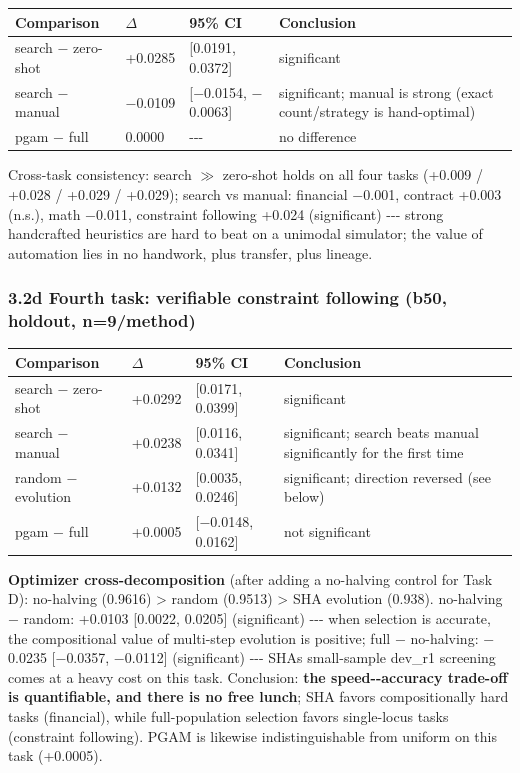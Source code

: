 \begin{longtable}[]{@{}llll@{}}
\toprule\noalign{}
Comparison & \(\Delta\) & 95\% CI & Conclusion \\
\midrule\noalign{}
\endhead
\bottomrule\noalign{}
\endlastfoot
search \(-\) zero-shot & +0.0285 & {[}0.0191, 0.0372{]} & significant \\
search \(-\) manual & \(-\)0.0109 & {[}\(-\)0.0154, \(-\)0.0063{]} & significant; manual is strong (exact count/strategy is hand-optimal) \\
pgam \(-\) full & 0.0000 & -\/-\/- & no difference \\
\end{longtable}

Cross-task consistency: search \(\gg\) zero-shot holds on all four tasks (+0.009 / +0.028 / +0.029 / +0.029); search vs manual: financial \(-\)0.001, contract +0.003 (n.s.), math \(-\)0.011, constraint following +0.024 (significant) -\/-\/- strong handcrafted heuristics are hard to beat on a unimodal simulator; the value of automation lies in no handwork, plus transfer, plus lineage.

\subsubsection{3.2d Fourth task: verifiable constraint following (b50, holdout, n=9/method)}\label{32d-fourth-task-verifiable-constraint-following-b50-holdout-n9method}

\begin{longtable}[]{@{}llll@{}}
\toprule\noalign{}
Comparison & \(\Delta\) & 95\% CI & Conclusion \\
\midrule\noalign{}
\endhead
\bottomrule\noalign{}
\endlastfoot
search \(-\) zero-shot & +0.0292 & {[}0.0171, 0.0399{]} & significant \\
search \(-\) manual & +0.0238 & {[}0.0116, 0.0341{]} & significant; search beats manual significantly for the first time \\
random \(-\) evolution & +0.0132 & {[}0.0035, 0.0246{]} & significant; direction reversed (see below) \\
pgam \(-\) full & +0.0005 & {[}\(-\)0.0148, 0.0162{]} & not significant \\
\end{longtable}

\textbf{Optimizer cross-decomposition} (after adding a no-halving control for Task D): no-halving (0.9616) \textgreater{} random (0.9513) \textgreater{} SHA evolution (0.938). no-halving \(-\) random: +0.0103 {[}0.0022, 0.0205{]} (significant) -\/-\/- when selection is accurate, the compositional value of multi-step evolution is positive; full \(-\) no-halving: \(-\)0.0235 {[}\(-\)0.0357, \(-\)0.0112{]} (significant) -\/-\/- SHA\textquotesingle s small-sample dev\_r1 screening comes at a heavy cost on this task. Conclusion: \textbf{the speed-\/-accuracy trade-off is quantifiable, and there is no free lunch}; SHA favors compositionally hard tasks (financial), while full-population selection favors single-locus tasks (constraint following). PGAM is likewise indistinguishable from uniform on this task (+0.0005).

